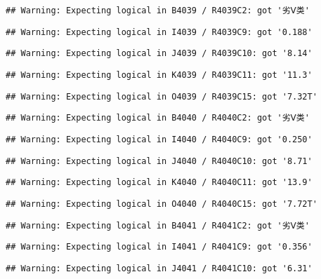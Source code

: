 \documentclass[
]{article}
\begin{document}
\begin{verbatim}
## Warning: Expecting logical in B4039 / R4039C2: got '劣Ⅴ类'
\end{verbatim}

\begin{verbatim}
## Warning: Expecting logical in I4039 / R4039C9: got '0.188'
\end{verbatim}

\begin{verbatim}
## Warning: Expecting logical in J4039 / R4039C10: got '8.14'
\end{verbatim}

\begin{verbatim}
## Warning: Expecting logical in K4039 / R4039C11: got '11.3'
\end{verbatim}

\begin{verbatim}
## Warning: Expecting logical in O4039 / R4039C15: got '7.32T'
\end{verbatim}

\begin{verbatim}
## Warning: Expecting logical in B4040 / R4040C2: got '劣Ⅴ类'
\end{verbatim}

\begin{verbatim}
## Warning: Expecting logical in I4040 / R4040C9: got '0.250'
\end{verbatim}

\begin{verbatim}
## Warning: Expecting logical in J4040 / R4040C10: got '8.71'
\end{verbatim}

\begin{verbatim}
## Warning: Expecting logical in K4040 / R4040C11: got '13.9'
\end{verbatim}

\begin{verbatim}
## Warning: Expecting logical in O4040 / R4040C15: got '7.72T'
\end{verbatim}

\begin{verbatim}
## Warning: Expecting logical in B4041 / R4041C2: got '劣Ⅴ类'
\end{verbatim}

\begin{verbatim}
## Warning: Expecting logical in I4041 / R4041C9: got '0.356'
\end{verbatim}

\begin{verbatim}
## Warning: Expecting logical in J4041 / R4041C10: got '6.31'
\end{verbatim}
\end{document}
